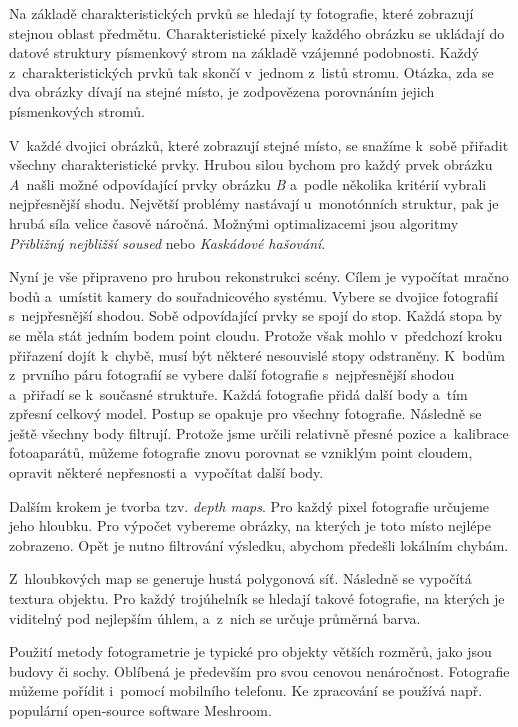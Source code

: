 \documentclass[12pt]{report}			%
\begin{document}
                Na základě charakteristických prvků se hledají ty fotografie, které zobrazují stejnou oblast předmětu. Charakteristické pixely každého obrázku se ukládají do datové struktury písmenkový strom na základě vzájemné podobnosti. Každý z~charakteristických prvků tak skončí v~jednom z~listů stromu. Otázka, zda se dva obrázky dívají na stejné místo, je zodpovězena porovnáním jejich písmenkových stromů.\cite{imagematching}

                V~každé dvojici obrázků, které zobrazují stejné místo, se snažíme k~sobě přiřadit všechny charakteristické prvky. Hrubou silou bychom pro každý prvek obrázku \emph{A}~našli možné odpovídající prvky obrázku \emph{B} a~podle několika kritérií vybrali nejpřesnější shodu. Největší problémy nastávají u~monotónních struktur, pak je hrubá síla velice časově náročná. Možnými optimalizacemi jsou algoritmy \emph{Přibližný nejbližší soused} nebo \emph{Kaskádové hašování}.\cite{featuresmatching}

                Nyní je vše připraveno pro hrubou rekonstrukci scény. Cílem je vypočítat mračno bodů a~umístit kamery do souřadnicového systému. Vybere se dvojice fotografií s~nejpřesnější shodou. Sobě odpovídající prvky se spojí do stop. Každá stopa by se měla stát jedním bodem point cloudu. Protože však mohlo v~předchozí kroku přiřazení dojít k~chybě, musí být některé nesouvislé stopy odstraněny. K~bodům z~prvního páru fotografií se vybere další fotografie s~nejpřesnější shodou a~přiřadí se k~současné struktuře. Každá fotografie přidá další body a~tím zpřesní celkový model. Postup se opakuje pro všechny fotografie. Následně se ještě všechny body filtrují. Protože jsme určili relativně přesné pozice a~kalibrace fotoaparátů, můžeme fotografie znovu porovnat se vzniklým point cloudem, opravit některé nepřesnosti a~vypočítat další body. \cite{structurefrommotion}

                Dalším krokem je tvorba tzv. \emph{depth maps}. Pro každý pixel fotografie určujeme jeho hloubku. Pro výpočet vybereme obrázky, na kterých je toto místo nejlépe zobrazeno. Opět je nutno filtrování výsledku, abychom předešli lokálním chybám. \cite{depthmapsestimation}

                Z~hloubkových map se generuje hustá polygonová síť. Následně se vypočítá textura objektu. Pro každý trojúhelník se hledají takové fotografie, na kterých je viditelný pod nejlepším úhlem, a~z~nich se určuje průměrná barva. \cite{meshing}\cite{texturing}

                Použití metody fotogrametrie je typické pro objekty větších rozměrů, jako jsou budovy či sochy. Oblíbená je především pro svou cenovou nenáročnost. Fotografie můžeme pořídit i~pomocí mobilního telefonu. Ke zpracování se používá např. populární open-source software Meshroom.
\end{document}
